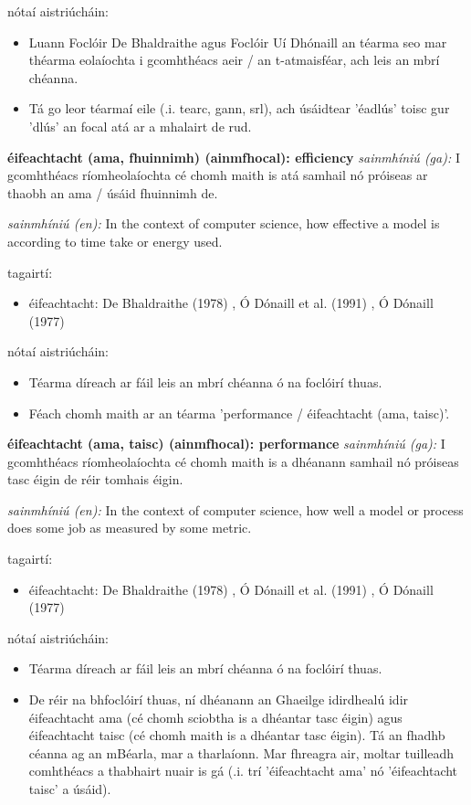 \documentclass{article}
\begin{document}
nótaí aistriúcháin:
\begin{itemize}
	\item Luann Foclóir De Bhaldraithe agus Foclóir Uí Dhónaill an téarma seo  mar théarma eolaíochta i gcomhthéacs aeir / an t-atmaisféar, ach leis an mbrí chéanna.
	\item Tá go leor téarmaí eile (.i. tearc, gann, srl), ach úsáidtear 'éadlús' toisc gur 'dlús' an focal atá ar a mhalairt de rud.
\end{itemize}


\textbf{éifeachtacht (ama, fhuinnimh) (ainmfhocal): efficiency}
\textit{sainmhíniú (ga):} I gcomhthéacs ríomheolaíochta cé chomh maith is atá samhail nó próiseas ar thaobh an ama / úsáid fhuinnimh de.

\textit{sainmhíniú (en):} In the context of computer science, how effective a model is according to time take or energy used.

tagairtí:
\begin{itemize}
	\item éifeachtacht: De Bhaldraithe (1978) \cite{de-bhaldraithe}, Ó Dónaill et al. (1991) \cite{focloir-beag}, Ó Dónaill (1977) \cite{odonaill}
\end{itemize}

nótaí aistriúcháin:
\begin{itemize}
	\item Téarma díreach ar fáil leis an mbrí chéanna ó na foclóirí thuas.
	\item Féach chomh maith ar an téarma 'performance / éifeachtacht (ama, taisc)'.
\end{itemize}


\textbf{éifeachtacht (ama, taisc) (ainmfhocal): performance}
\textit{sainmhíniú (ga):} I gcomhthéacs ríomheolaíochta cé chomh maith is a dhéanann samhail nó próiseas tasc éigin de réir tomhais éigin.

\textit{sainmhíniú (en):} In the context of computer science, how well a model or process does some job as measured by some metric.

tagairtí:
\begin{itemize}
	\item éifeachtacht: De Bhaldraithe (1978) \cite{de-bhaldraithe}, Ó Dónaill et al. (1991) \cite{focloir-beag}, Ó Dónaill (1977) \cite{odonaill}
\end{itemize}

nótaí aistriúcháin:
\begin{itemize}
	\item Téarma díreach ar fáil leis an mbrí chéanna ó na foclóirí thuas.
	\item De réir na bhfoclóirí thuas, ní dhéanann an Ghaeilge idirdhealú idir éifeachtacht ama (cé chomh sciobtha is a dhéantar tasc éigin) agus éifeachtacht taisc (cé chomh maith is a dhéantar tasc éigin). Tá an fhadhb céanna ag an mBéarla, mar a tharlaíonn. Mar fhreagra air, moltar tuilleadh comhthéacs a thabhairt nuair is gá (.i. trí 'éifeachtacht ama' nó 'éifeachtacht taisc' a úsáid).
\end{itemize}



            \printbibliography[title={Tagairtí}]
            
\end{document}
